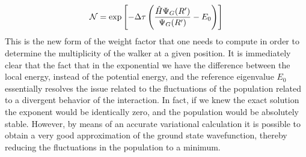 \begin{equation}
{\cal N}= \exp\left[-\Delta\tau\left(\frac{\hat{H}\Psi_G(R')}{\Psi_G(R')}-E_0\right)\right]
\end{equation}
This is the new form of the weight factor that one needs to compute in order to determine the multiplicity of the walker at a given position. It is immediately clear that the fact that in the exponential we have the difference between the local energy, instead of the potential energy, and the reference eigenvalue $E_0$ essentially resolves the issue related to the fluctuations of the population related to a divergent behavior of the interaction. In fact, if we knew the exact solution the exponent would be identically zero, and the population would be absolutely stable. However, by means of an accurate variational calculation it is possible to obtain a very good approximation of the ground state wavefunction, thereby reducing the fluctuations in the population to a minimum. 

